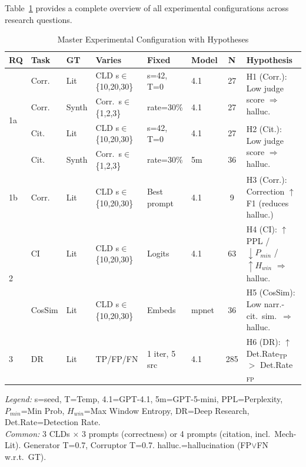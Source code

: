 Table~\ref{tab:master} provides a complete overview of all experimental configurations across research questions.

\begin{table}[H]
\centering
\caption{Master Experimental Configuration with Hypotheses}
\label{tab:master}
\scriptsize
\renewcommand{\arraystretch}{1.2}
\begin{tabularx}{\textwidth}{@{}l l l l l l c X@{}}
\toprule
\textbf{RQ} & \textbf{Task} & \textbf{GT} & \textbf{Varies} & \textbf{Fixed} & \textbf{Model} & \textbf{N} & \textbf{Hypothesis} \\
\midrule
\multirow{4}{*}{1a} 
  & Corr. & Lit & CLD s$\in$\{10,20,30\} & s=42, T=0 & 4.1 & 27 & \multirow{2}{*}{H1 (Corr.): Low judge score $\Rightarrow$ halluc.} \\
  & Corr. & Synth & Corr.\ s$\in$\{1,2,3\} & rate=30\% & 4.1 & 27 & \\
  & Cit. & Lit & CLD s$\in$\{10,20,30\} & s=42, T=0 & 4.1 & 27 & \multirow{2}{*}{H2 (Cit.): Low judge score $\Rightarrow$ halluc.} \\
  & Cit. & Synth & Corr.\ s$\in$\{1,2,3\} & rate=30\% & 5m & 36 & \\
\midrule
1b & Corr. & Lit & CLD s$\in$\{10,20,30\} & Best prompt & 4.1 & 9 & H3 (Corr.): Correction $\uparrow$ F1 (reduces halluc.) \\
\midrule
\multirow{2}{*}{2}
  & CI & Lit & CLD s$\in$\{10,20,30\} & Logits & 4.1 & 63 & H4 (CI): $\uparrow$PPL / $\downarrow P_{min}$ / $\uparrow H_{win}$ $\Rightarrow$ halluc. \\
  & CosSim & Lit & CLD s$\in$\{10,20,30\} & Embeds & mpnet & 36 & H5 (CosSim): Low narr.-cit.\ sim.\ $\Rightarrow$ halluc. \\
\midrule
3 & DR & Lit & TP/FP/FN & 1 iter, 5 src & 4.1 & 285 & H6 (DR): $\uparrow$Det.Rate$_{\text{TP}}$ $>$ Det.Rate$_{\text{FP}}$ \\
\bottomrule
\end{tabularx}
\vspace{0.3em}

\scriptsize
\textit{Legend:} s=seed, T=Temp, 4.1=GPT-4.1, 5m=GPT-5-mini, PPL=Perplexity, $P_{min}$=Min Prob, $H_{win}$=Max Window Entropy, DR=Deep Research, Det.Rate=Detection Rate. \\
\textit{Common:} 3 CLDs $\times$ 3 prompts (correctness) or 4 prompts (citation, incl.\ Mech-Lit). Generator T=0.7, Corruptor T=0.7. halluc.=hallucination (FP$\lor$FN w.r.t.\ GT).
\end{table}

